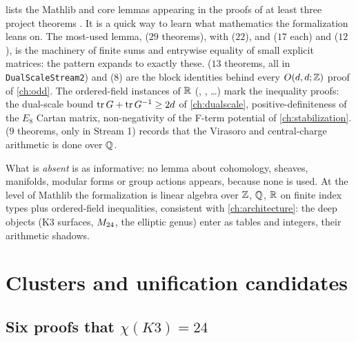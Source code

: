 lists the Mathlib and core lemmas appearing in the proofs of at
least three project theorems . It is a quick way to learn
what mathematics the formalization leans on. The most-used lemma,
 ($29$ theorems), with  ($22$),
 and  ($17$ each) and
 ($12$), is the machinery of finite sums and entrywise equality
of small explicit matrices: the pattern  expands to exactly these.  ($13$ theorems, all in
\texttt{DualScaleStream2}) and  ($8$) are the block identities
behind every $O(d,d;\mathbb{Z})$ proof of \cref{ch:odd}. The ordered-field instances of $\mathbb{R}$
(, , \dots) mark the
inequality proofs: the dual-scale bound $\operatorname{tr} G+\operatorname{tr} G^{-1}\ge2d$ of \cref{ch:dualscale},
positive-definiteness of the $E_8$ Cartan matrix, non-negativity of the F-term potential
of \cref{ch:stabilization}.  ($9$ theorems, only in Stream 1)
records that the Virasoro and central-charge arithmetic is done over $\mathbb{Q}$.

What is \emph{absent} is as informative: no lemma about cohomology, sheaves, manifolds,
modular forms or group actions appears, because none is used. At the level of Mathlib the
formalization is linear algebra over $\mathbb{Z}$, $\mathbb{Q}$, $\mathbb{R}$ on finite index types plus
ordered-field inequalities, consistent with \cref{ch:architecture}: the deep objects (K3
surfaces, $M_{24}$, the elliptic genus) enter as tables and integers, their arithmetic
shadows.

\section{Clusters and unification candidates}\label{sec:atlas:unify}

\subsection{Six proofs that $\chi(K3)=24$}

